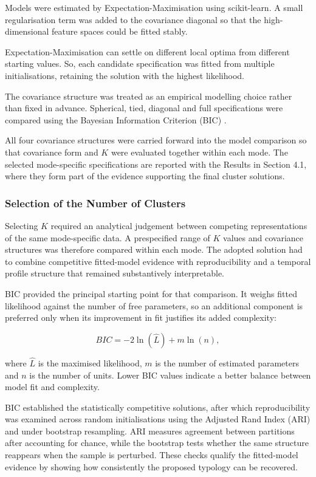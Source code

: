 Models were estimated by Expectation-Maximisation using scikit-learn. A small regularisation term was added to the covariance diagonal so that the high-dimensional feature spaces could be fitted stably.

Expectation-Maximisation can settle on different local optima from different starting values. So, each candidate specification was fitted from multiple initialisations, retaining the solution with the highest likelihood.

The covariance structure was treated as an empirical modelling choice rather than fixed in advance. Spherical, tied, diagonal and full specifications were compared using the Bayesian Information Criterion (BIC) \citep{Schwarz1978,Fraley2002}.

All four covariance structures were carried forward into the model comparison so that covariance form and $K$ were evaluated together within each mode. The selected mode-specific specifications are reported with the Results in Section 4.1, where they form part of the evidence supporting the final cluster solutions.

\subsubsection{Selection of the Number of Clusters}

Selecting $K$ required an analytical judgement between competing representations of the same mode-specific data. A prespecified range of $K$ values and covariance structures was therefore compared within each mode. The adopted solution had to combine competitive fitted-model evidence with reproducibility and a temporal profile structure that remained substantively interpretable.

BIC provided the principal starting point for that comparison. It weighs fitted likelihood against the number of free parameters, so an additional component is preferred only when its improvement in fit justifies its added complexity:

\begin{equation}
BIC = -2\ln(\widehat{L}) + m \ln(n),
\end{equation}

where $\widehat{L}$ is the maximised likelihood, $m$ is the number of estimated parameters and $n$ is the number of units. Lower BIC values indicate a better balance between model fit and complexity.

BIC established the statistically competitive solutions, after which reproducibility was examined across random initialisations using the Adjusted Rand Index (ARI) \citep{Hubert1985} and under bootstrap resampling. ARI measures agreement between partitions after accounting for chance, while the bootstrap tests whether the same structure reappears when the sample is perturbed. These checks qualify the fitted-model evidence by showing how consistently the proposed typology can be recovered.

